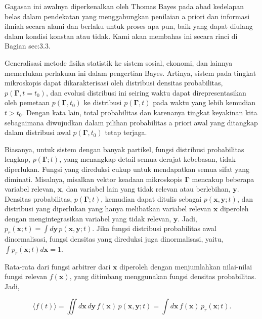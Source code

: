 \documentclass[a4paper,12pt]{book}
\begin{document}
Gagasan ini awalnya diperkenalkan oleh Thomas Bayes pada abad kedelapan belas dalam pendekatan yang menggabungkan penilaian a priori dan informasi ilmiah secara alami dan berlaku untuk proses apa pun, baik yang dapat diulang dalam kondisi konstan atau tidak. Kami akan membahas ini secara rinci di Bagian  {sec:3.3}.

Generalisasi metode fisika statistik ke sistem sosial, ekonomi, dan lainnya memerlukan perlakuan ini dalam pengertian Bayes. Artinya, sistem pada tingkat mikroskopis dapat dikarakterisasi oleh distribusi densitas probabilitas, $p(\mathbf{\Gamma}, t = t_0)$, dan evolusi distribusi ini seiring waktu dapat direpresentasikan oleh pemetaan $p(\mathbf{\Gamma}, t_0)$ ke distribusi $p(\mathbf{\Gamma}, t)$ pada waktu yang lebih kemudian $t > t_0$. Dengan kata lain, total probabilitas dan karenanya tingkat keyakinan kita sebagaimana diwujudkan dalam pilihan probabilitas a priori awal yang ditangkap dalam distribusi awal $p(\mathbf{\Gamma}, t_0)$ tetap terjaga.

Biasanya, untuk sistem dengan banyak partikel, fungsi distribusi probabilitas lengkap, $p(\mathbf{\Gamma}; t)$, yang menangkap detail semua derajat kebebasan, tidak diperlukan. Fungsi yang direduksi cukup untuk mendapatkan semua sifat yang diminati. Misalnya, misalkan vektor keadaan mikroskopis $\mathbf{\Gamma}$ mencakup beberapa variabel relevan, $\mathbf{x}$, dan variabel lain yang tidak relevan atau berlebihan, $\mathbf{y}$. Densitas probabilitas, $p(\mathbf{\Gamma}; t)$, kemudian dapat ditulis sebagai $p(\mathbf{x}, \mathbf{y}; t)$, dan distribusi yang diperlukan yang hanya melibatkan variabel relevan $\mathbf{x}$ diperoleh dengan mengintegrasikan variabel yang tidak relevan, $\mathbf{y}$. Jadi, $p_r(\mathbf{x}; t) = \int d\mathbf{y} \, p(\mathbf{x}, \mathbf{y}; t)$. Jika fungsi distribusi probabilitas awal dinormalisasi, fungsi densitas yang direduksi juga dinormalisasi, yaitu, $\int p_r(\mathbf{x}; t) d\mathbf{x} = 1$.

Rata-rata dari fungsi arbitrer dari $\mathbf{x}$ diperoleh dengan menjumlahkan nilai-nilai fungsi relevan $f(\mathbf{x})$, yang ditimbang menggunakan fungsi densitas probabilitas. Jadi,

\begin{equation}
\langle f(t) \rangle = \iint d\mathbf{x} \, d\mathbf{y} \, f(\mathbf{x}) \, p(\mathbf{x}, \mathbf{y}; t) = \int d\mathbf{x} \, f(\mathbf{x}) \, p_r(\mathbf{x}; t).
\label{eq:average}
\end{equation}
\end{document}
